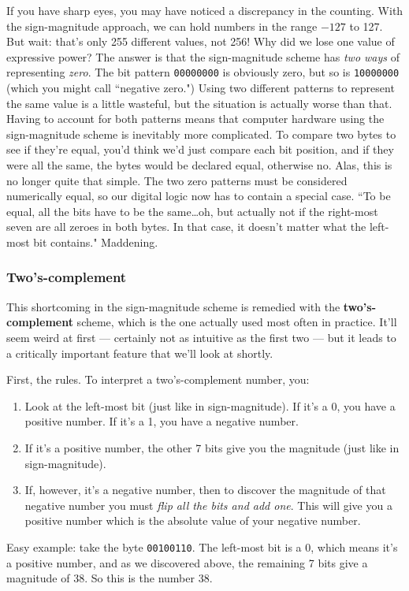 If you have sharp eyes, you may have noticed a discrepancy in the counting.
With the sign-magnitude approach, we can hold numbers in the range $-127$
to 127. But wait: that's only 255 different values, not 256! Why did we
lose one value of expressive power? The answer is that the sign-magnitude
scheme has \textit{two ways} of representing \textit{zero}. The bit
pattern \texttt{00000000} is obviously zero, but so is \texttt{10000000}
(which you might call ``negative zero.") Using two different patterns to
represent the same value is a little wasteful, but the situation is
actually worse than that. Having to account for both patterns means that
computer hardware using the sign-magnitude scheme is inevitably more
complicated. To compare two bytes to see if they're equal, you'd think we'd
just compare each bit position, and if they were all the same, the bytes
would be declared equal, otherwise no. Alas, this is no longer quite that
simple. The two zero patterns must be considered numerically equal, so our
digital logic now has to contain a special case. ``To be equal, all the
bits have to be the same\dots oh, but actually not if the right-most seven
are all zeroes in both bytes. In that case, it doesn't matter what the
left-most bit contains." Maddening.

\subsubsection{Two's-complement}

This shortcoming in the sign-magnitude scheme is remedied with the
\textbf{two's-complement} scheme, which is the one actually used most often
in practice. It'll seem weird at first --- certainly not as intuitive as
the first two --- but it leads to a critically important feature that we'll
look at shortly.

First, the rules. To interpret a two's-complement number, you:
\begin{enumerate}
\item Look at the left-most bit (just like in sign-magnitude). If it's a 0,
you have a positive number. If it's a 1, you have a negative number.
\item If it's a positive number, the other 7 bits give you the magnitude
(just like in sign-magnitude).
\item If, however, it's a negative number, then to discover the magnitude
of that negative number you must \textit{flip all the bits and add one}.
This will give you a positive number which is the absolute value of your
negative number.
\end{enumerate}
Easy example: take the byte \texttt{00100110}. The left-most bit is a 0,
which means it's a positive number, and as we discovered above, the
remaining 7 bits give a magnitude of 38. So this is the number 38.

